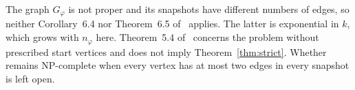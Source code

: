 The graph $G_\varphi$ is not proper and its snapshots have different numbers of edges, so neither Corollary~6.4 nor Theorem~6.5 of~\cite{deligkas2025} applies. The latter is exponential in $k$, which grows with $n_\varphi$ here. Theorem~5.4 of~\cite{deligkas2025} concerns the problem without prescribed start vertices and does not imply Theorem~\ref{thm:strict}. Whether \SFIX{} remains NP-complete when every vertex has at most two edges in every snapshot is left open.
